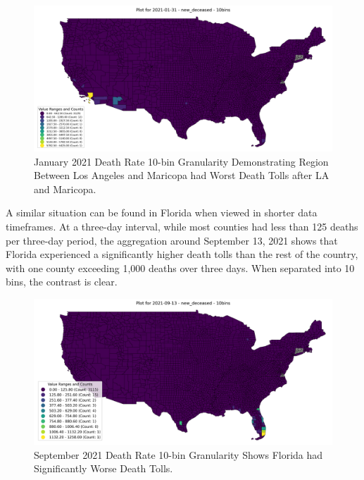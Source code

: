 \documentclass[sigconf,screen,nonacm]{acmart}
\begin{document}
\begin{figure}[h]
  \centering
  \includegraphics[width=1\linewidth]{Figures/Plot for Month Ending 2021-01-31 - new_deceased - 10bins.png}
  \caption{January 2021 Death Rate 10-bin Granularity Demonstrating Region Between Los Angeles and Maricopa had Worst Death Tolls after LA and Maricopa.}
\end{figure}

A similar situation can be found in Florida when viewed in shorter data timeframes. At a three-day interval, while most counties had less than 125 deaths per three-day period, the aggregation around September 13, 2021 shows that Florida experienced a significantly higher death tolls than the rest of the country, with one county exceeding 1,000 deaths over three days. When separated into 10 bins, the contrast is clear.

\begin{figure}[H]
  \centering
  \includegraphics[width=1\linewidth]{Figures/Plot for 2021-09-13 - new_deceased - 10bins.png}
  \caption{September 2021 Death Rate 10-bin Granularity Shows Florida had Significantly Worse Death Tolls.}
\end{figure}
\end{document}

